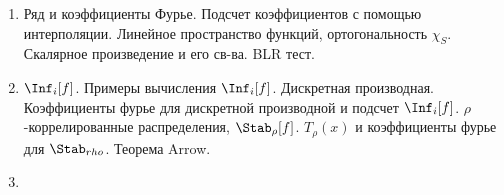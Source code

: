 \begin{enumerate}
    \item Ряд и коэффициенты Фурье. Подсчет коэффициентов с помощью интерполяции. Линейное пространство функций, ортогональность
        $\chi_S$. Скалярное произведение и его св-ва. BLR тест.
    \item $\Inf_i[f]$. Примеры вычисления $\Inf_i[f]$. Дискретная производная. Коэффициенты фурье для дискретной производной и 
        подсчет $\Inf_i[f]$. $\rho$-коррелированные распределения, $\Stab_{\rho}[f]$. $T_{\rho}(x)$ и коэффициенты фурье для
        $\Stab_{rho}$. Теорема Arrow.
    \item 
\end{enumerate}